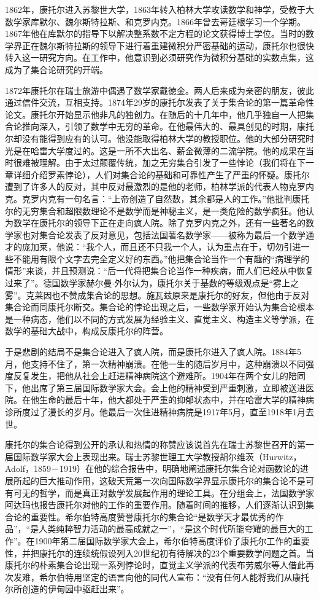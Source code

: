 \documentclass{article}
\begin{document}
1862年，康托尔进入苏黎世大学，1863年转入柏林大学攻读数学和神学，受教于大数学家库默尔、魏尔斯特拉斯、和克罗内克。1866年曾去哥廷根学习一个学期。1867年他在库默尔的指导下以解决整系数不定方程的论文获得博士学位。当时的数学界正在魏尔斯特拉斯的领导下进行着重建微积分严密基础的运动，康托尔也很快转入这一研究方向。在工作中，他意识到必须研究作为微积分基础的实数点集，这成为了集合论研究的开端。

1872年康托尔在瑞士旅游中偶遇了数学家戴徳金。两人后来成为亲密的朋友，彼此通过信件交流，互相支持。1874年29岁的康托尔发表了关于集合论的第一篇革命性论文。康托尔开始显示他非凡的独创力。在随后的十几年中，他几乎独自一人把集合论推向深入，引领了数学中无穷的革命。在他最伟大的、最具创见的时期，康托尔却没有能得到应有的认可。他没能取得柏林大学的教授职位。他的大部分研究时光是在哈雷大学度过的。这是一所不大出名、薪金微薄的二流学院。他的成果在当时很难被理解。由于太过颠覆传统，加之无穷集合引发了一些悖论（我们将在下一章详细介绍罗素悖论），人们对集合论的基础和可靠性产生了严重的怀疑。康托尔遭到了许多人的反对，其中反对最激烈的是他的老师，柏林学派的代表人物克罗内克。克罗内克有一句名言：“上帝创造了自然数，其余都是人的工作。”他批判康托尔的无穷集合和超限数理论不是数学而是神秘主义，是一类危险的数学疯狂。他认为数学在康托尔的领导下正在走向疯人院。除了克罗内克之外，还有一些著名的数学家也对集合论发表了反对意见，包括法国著名数学家——被称为最后一个数学通才的庞加莱，他说：“我个人，而且还不只我一个人，认为重点在于，切勿引进一些不能用有限个文字去完全定义好的东西。”他把集合论当作一个有趣的“病理学的情形”来谈，并且预测说：“后一代将把集合论当作一种疾病，而人们已经从中恢复过来了”。德国数学家赫尔曼$\cdot$外尔认为，康托尔关于基数的等级观点是“雾上之雾”。克莱因也不赞成集合论的思想。施瓦兹原来是康托尔的好友，但他由于反对集合论而同康托尔断交。集合论的悖论出现之后，一些数学家开始认为集合论根本是一种病态，他们以不同的方式发展为经验主义、直觉主义、构造主义等学派，在数学的基础大战中，构成反康托尔的阵营。

于是悲剧的结局不是集合论进入了疯人院，而是康托尔进入了疯人院。1884年5月，他支持不住了，第一次精神崩溃。在他一生的随后岁月中，这种崩溃以不同强度反复发生，把他从社会上赶进精神病院这个避难所。1904年在两个女儿的陪同下，他出席了第三届国际数学家大会。会上他的精神受到严重刺激，立即被送进医院。在他生命的最后十年，他大都处于严重的抑郁状态中，并在哈雷大学的精神病诊所度过了漫长的岁月。他最后一次住进精神病院是1917年5月，直至1918年1月去世。

康托尔的集合论得到公开的承认和热情的称赞应该说首先在瑞士苏黎世召开的第一届国际数学家大会上表现出来。瑞士苏黎世理工大学教授胡尔维茨（Hurwitz，Adolf，1859－1919）在他的综合报告中，明确地阐述康托尔集合论对函数论的进展所起的巨大推动作用，这破天荒第一次向国际数学界显示康托尔的集合论不是可有可无的哲学，而是真正对数学发展起作用的理论工具。在分组会上，法国数学家阿达玛也报告康托尔对他的工作的重要作用。随着时间的推移，人们逐渐认识到集合论的重要性。希尔伯特高度赞誉康托尔的集合论“是数学天才最优秀的作品”，“是人类纯粹智力活动的最高成就之一”，“是这个时代所能夸耀的最巨大的工作”。在1900年第二届国际数学家大会上，希尔伯特高度评价了康托尔工作的重要性，并把康托尔的连续统假设列入20世纪初有待解决的23个重要数学问题之首。当康托尔的朴素集合论出现一系列悖论时，直觉主义学派的代表布劳威尔等人借此再次发难，希尔伯特用坚定的语言向他的同代人宣布：“没有任何人能将我们从康托尔所创造的伊甸园中驱赶出来”。
\end{document}
